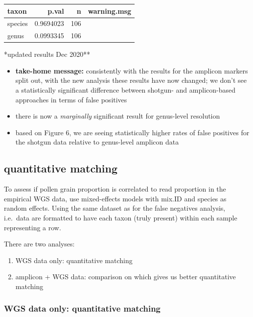 \documentclass[
]{article}
\providecommand{\tightlist}{%
  \setlength{\itemsep}{0pt}\setlength{\parskip}{0pt}}
\begin{document}
\begin{table}[H]
\centering
\begin{tabular}{l|r|r|l}
\hline
taxon & p.val & n & warning.msg\\
\hline
species & 0.9694023 & 106 & \\
\hline
genus & 0.0993345 & 106 & \\
\hline
\end{tabular}
\end{table}

*updated results Dec 2020**

\begin{itemize}
\tightlist
\item
  \textbf{take-home message:} consistently with the results for the
  amplicon markers split out, with the new analysis these results have
  now changed; we don't see a statistically significant difference
  between shotgun- and amplicon-based approaches in terms of false
  positives
\item
  there is now a \emph{marginally} significant result for genus-level
  resolution
\item
  based on Figure 6, we are seeing statistically higher rates of false
  positives for the shotgun data relative to genus-level amplicon data
\end{itemize}

\hypertarget{quantitative-matching}{%
\subsection{quantitative matching}\label{quantitative-matching}}

To assess if pollen grain proportion is correlated to read proportion in
the empirical WGS data, use mixed-effects models with mix.ID and species
as random effects. Using the same dataset as for the false negatives
analysis, i.e.~data are formatted to have each taxon (truly present)
within each sample representing a row.

There are two analyses:

\begin{enumerate}
\def\labelenumi{\arabic{enumi}.}
\tightlist
\item
  WGS data only: quantitative matching
\item
  amplicon + WGS data: comparison on which gives us better quantitative
  matching
\end{enumerate}

\hypertarget{wgs-data-only-quantitative-matching}{%
\subsubsection{WGS data only: quantitative
matching}\label{wgs-data-only-quantitative-matching}}
\end{document}
